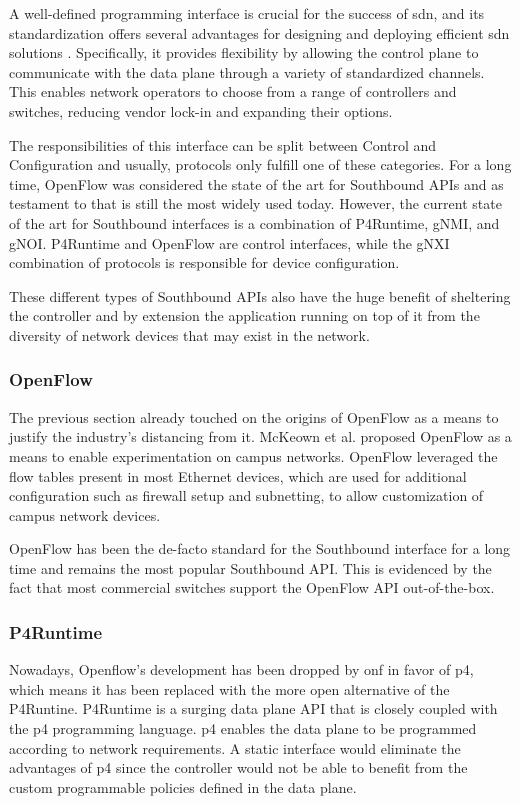A well-defined programming interface is crucial for the success of \gls{sdn}, and its standardization offers several advantages for designing and deploying efficient \gls{sdn} solutions\cite{latif_comprehensive_2020} \cite{kreutz_software-defined_2015}. Specifically, it provides flexibility by allowing the control plane to communicate with the data plane through a variety of standardized channels. This enables network operators to choose from a range of controllers and switches, reducing vendor lock-in and expanding their options.

The responsibilities of this interface can be split between Control and Configuration\cite{peterson_software-defined_2021} and usually, protocols only fulfill one of these categories. For a long time, OpenFlow was considered the state of the art for Southbound APIs and as testament to that is still the most widely used today\cite{latif_comprehensive_2020}. However, the current state of the art for Southbound interfaces is a combination of P4Runtime, gNMI, and gNOI. P4Runtime and OpenFlow are control interfaces, while the gNXI combination of protocols is responsible for device configuration\cite{peterson_software-defined_2021}.

These different types of Southbound APIs also have the huge benefit of sheltering the controller and by extension the application running on top of it from the diversity of network devices that may exist in the network. \cite{peterson_software-defined_2021}

\subsubsection{OpenFlow}
The previous section already touched on the origins of OpenFlow as a means to justify the industry's distancing from it. McKeown et al. proposed OpenFlow\cite{mckeown_openflow_2008} as a means to enable experimentation on campus networks. OpenFlow leveraged the flow tables present in most Ethernet devices, which are used for additional configuration such as firewall setup and subnetting, to allow customization of campus network devices. \cite{xia_survey_2015}

OpenFlow has been the de-facto standard for the Southbound interface for a long time\cite{nunes_survey_2014} and remains the most popular Southbound API. This is evidenced by the fact that most commercial switches support the OpenFlow API out-of-the-box\cite{kreutz_software-defined_2015}.

\subsubsection{P4Runtime}
Nowadays, Openflow's development has been dropped by \gls{onf} in favor of \gls{p4}, which means it has been replaced with the more open alternative of the P4Runtine. P4Runtime is a surging data plane API\cite{hauser_survey_2021} that is closely coupled with the \gls{p4} programming language. \gls{p4} enables the data plane to be programmed according to network requirements. A static interface would eliminate the advantages of \gls{p4} since the controller would not be able to benefit from the custom programmable policies defined in the data plane. 

